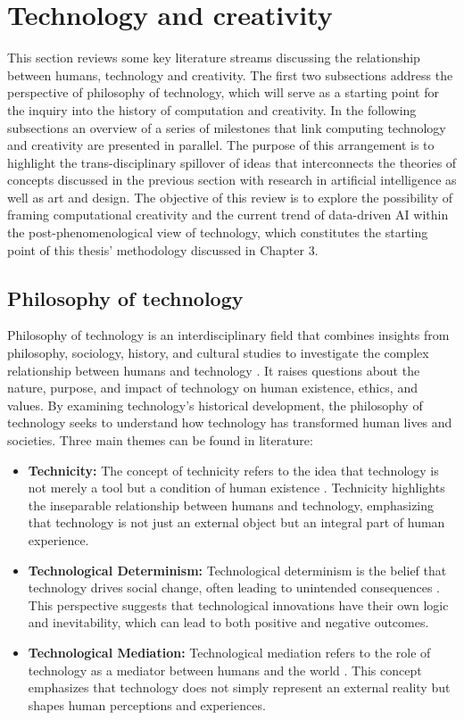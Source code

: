\section{Technology and creativity}\label{sec:technology-and-creativity}
This section reviews some key literature streams discussing the relationship between humans, technology and creativity. The first two subsections address the perspective of philosophy of technology, which will serve as a starting point for the inquiry into the history of computation and creativity. In the following subsections an overview of a series of milestones that link computing technology and creativity are presented in parallel. The purpose of this arrangement is to highlight the trans-disciplinary spillover of ideas that interconnects the theories of concepts discussed in the previous section with research in artificial intelligence as well as art and design. The objective of this review is to explore the possibility of framing computational creativity and the current trend of data-driven AI within the post-phenomenological view of technology, which constitutes the starting point of this thesis' methodology discussed in Chapter 3.

\subsection{Philosophy of technology}
Philosophy of technology is an interdisciplinary field that combines insights from philosophy, sociology, history, and cultural studies to investigate the complex relationship between humans and technology \citep{Ihde1993}. It raises questions about the nature, purpose, and impact of technology on human existence, ethics, and values. By examining technology's historical development, the philosophy of technology seeks to understand how technology has transformed human lives and societies. Three main themes can be found in literature:

\begin{itemize}[noitemsep]
\item \textbf{Technicity:} The concept of technicity refers to the idea that technology is not merely a tool but a condition of human existence \citep{Feenberg1991}. Technicity highlights the inseparable relationship between humans and technology, emphasizing that technology is not just an external object but an integral part of human experience.
\item \textbf{Technological Determinism:} Technological determinism is the belief that technology drives social change, often leading to unintended consequences \citep{Smith1994}. This perspective suggests that technological innovations have their own logic and inevitability, which can lead to both positive and negative outcomes.
\item \textbf{Technological Mediation:} Technological mediation refers to the role of technology as a mediator between humans and the world \citep{Verbeek2005}. This concept emphasizes that technology does not simply represent an external reality but shapes human perceptions and experiences.
\end{itemize}

